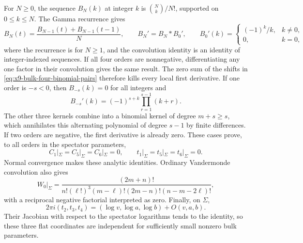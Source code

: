 For $N\geq0$, the sequence $B_N(k)$ at integer $k$ is
$\binom Nk/N!$, supported on $0\leq k\leq N$. The Gamma
recurrence gives
\begin{equation}
 B_N(t)=\frac{B_{N-1}(t)+B_{N-1}(t-1)}{N},\qquad
 B_N'=B_N*B_0',\qquad
 B_0'(k)=\begin{cases}(-1)^k/k,&k\neq0,\\0,&k=0,\end{cases}
 \label{eq:x9-bulk-binomial-convolution}
\end{equation}
where the recurrence is for $N\geq1$, and the convolution identity
is an identity of integer-indexed sequences. If all four orders
are nonnegative, differentiating any one factor in their
convolution gives the same result. The zero sum of the shifts in
\eqref{eq:x9-bulk-four-binomial-pairs} therefore kills every local
first derivative.
If one order is $-s<0$, then $B_{-s}(k)=0$ for all integers and
\begin{equation}
 B_{-s}'(k)=(-1)^{s+k}\prod_{r=1}^{s-1}(k+r).
 \label{eq:x9-bulk-negative-binomial}
\end{equation}
The other three kernels combine into a binomial kernel of degree
$m+s\geq s$, which annihilates this alternating polynomial of
degree $s-1$ by finite differences. If two orders are negative,
the first derivative is already zero. These cases prove, to all
orders in the spectator parameters,
\begin{equation}
 C_1|_\Sigma=C_5|_\Sigma=C_6|_\Sigma=0,\qquad
 t_1|_\Sigma=t_5|_\Sigma=t_6|_\Sigma=0.
 \label{eq:x9-bulk-exact-flat-locus}
\end{equation}
Normal convergence makes these analytic identities. Ordinary
Vandermonde convolution also gives
\begin{equation}
 [v^\ell a^m b^n]W_0|_\Sigma
 =\frac{(2m+n)!}
 {n!(\ell!)^3(m-\ell)!(2m-n)!(n-m-2\ell)!},
 \label{eq:x9-bulk-restricted-fundamental}
\end{equation}
with a reciprocal negative factorial interpreted as zero.
Finally, on $\Sigma$,
\begin{equation}
 2\pi i(t_2,t_3,t_4)=(\log v,\log a,\log b)+O(v,a,b).
 \label{eq:x9-bulk-spectator-independence}
\end{equation}
Their Jacobian with respect to the spectator
logarithms tends to the identity, so these three flat coordinates
are independent for sufficiently small nonzero bulk parameters.

